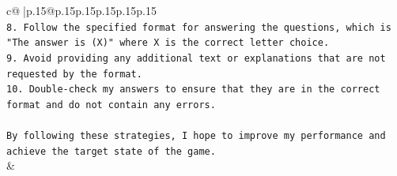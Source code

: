 \documentclass{article}
\begin{document}
{\begin{supertabular}{c@{$\;$}|p{.15\linewidth}@{}p{.15\linewidth}p{.15\linewidth}p{.15\linewidth}p{.15\linewidth}p{.15\linewidth}}
{{{\\ 
\texttt{8. Follow the specified format for answering the questions, which is "The answer is (X)" where X is the correct letter choice.} \\
\texttt{9. Avoid providing any additional text or explanations that are not requested by the format.} \\
\texttt{10. Double{-}check my answers to ensure that they are in the correct format and do not contain any errors.} \\
\\ 
\texttt{By following these strategies, I hope to improve my performance and achieve the target state of the game.} \\
            }
        }
    }
    & \\ \\

\end{supertabular}
}
\end{document}
